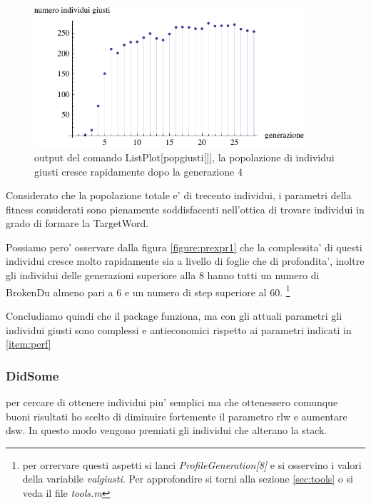\documentclass[12pt, a4paper]{article}
\begin{document}
\begin{figure}[!h]
\begin{center}
\includegraphics[width=10.0cm]{indgiusti_expr1_run1.pdf}
\caption{output del comando ListPlot[popgiusti[]], la popolazione di individui giusti cresce rapidamente dopo la generazione 4} 
\label{figure:plotpopgiusti1}
\end{center}
\end{figure}

Considerato che la popolazione totale e' di trecento individui, i parametri della fitness considerati sono pienamente soddisfacenti nell'ottica di trovare individui in grado di formare la TargetWord.

Possiamo pero' osservare dalla figura \ref{figure:prexpr1} che la complessita' di questi individui cresce molto rapidamente sia a livello di foglie che di profondita', inoltre gli individui delle generazioni superiore alla 8 hanno tutti un numero di BrokenDu almeno pari a 6 e un numero di step superiore al 60.
\footnote{per orrervare questi aspetti si lanci {\itshape ProfileGeneration[8]} e si osservino i valori della variabile {\itshape valgiusti}. Per approfondire si torni alla sezione \ref{sec:tools} o si veda il file {\itshape tools.m}}

Concludiamo quindi che il package funziona, ma con gli attuali parametri gli individui giusti sono complessi e antieconomici rispetto ai parametri indicati in \ref{item:perf}

\subsubsection{DidSome}
per cercare di ottenere individui piu' semplici ma che ottenessero comunque buoni risultati ho scelto di diminuire fortemente il parametro rlw e aumentare dsw. In questo modo vengono premiati gli individui che alterano la stack.
\end{document}
